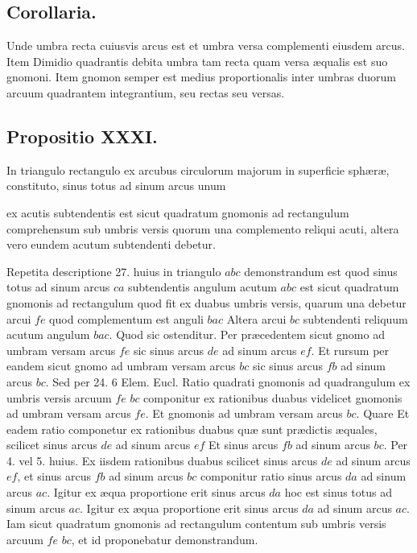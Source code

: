 \documentclass[11pt,a4paper]{article}
\begin{document}
\subsection*{Corollaria.}

Unde umbra recta cuiusvis arcus est et umbra versa complementi
eiusdem arcus. Item Dimidio quadrantis debita umbra tam recta
quam versa æqualis est suo gnomoni. Item gnomon semper est
medius proportionalis inter umbras duorum arcuum quadrantem
integrantium, seu rectas seu versas.

\subsection*{Propositio XXXI.}

In triangulo rectangulo ex arcubus circulorum majorum in
superficie sphæræ, constituto, sinus totus ad sinum arcus unum

ex acutis subtendentis est sicut quadratum gnomonis
ad rectangulum comprehensum sub umbris versis quorum
una complemento reliqui acuti, altera vero eundem
acutum subtendenti debetur.

Repetita descriptione 27. huius in triangulo $abc$ demonstrandum
est quod sinus totus ad sinum arcus $ca$ subtendentis angulum
acutum $abc$ est sicut quadratum gnomonis ad rectangulum
quod fit ex duabus umbris versis, quarum una debetur arcui
$fe$ quod complementum est anguli $bac$ Altera  arcui
$bc$ subtendenti reliquum acutum angulum $bac$. Quod sic
ostenditur. Per præcedentem sicut gnomo ad umbram versam
arcus $fe$ sic sinus arcus $de$ ad sinum arcus $ef$. Et rursum
per eandem sicut gnomo ad umbram versam arcus $bc$ sic
sinus arcus $fb$ ad sinum arcus $bc$. Sed per 24. 6 Elem. Eucl.
Ratio quadrati gnomonis ad quadrangulum ex umbris versis arcuum
$fe$ $bc$ componitur ex rationibus duabus videlicet gnomonis ad umbram
versam arcus $fe$. Et gnomonis ad umbram versam arcus $bc$. Quare
Et eadem ratio componetur ex rationibus duabus quæ sunt prædictis
æquales, scilicet sinus arcus $de$ ad sinum arcus $ef$ Et sinus arcus
$fb$ ad sinum arcus $bc$. Per 4. vel 5. huius. Ex iisdem rationibus
duabus scilicet sinus arcus $de$ ad sinum arcus $ef$, et sinus arcus
$fb$ ad sinum arcus $bc$ componitur ratio sinus arcus $da$ ad sinum
arcus $ac$. Igitur ex æqua proportione erit sinus arcus $da$ hoc
est sinus totus ad sinum arcus $ac$. Igitur ex æqua proportione
erit sinus arcus $da$ ad sinum arcus $ac$. Iam sicut quadratum
gnomonis ad rectangulum contentum sub umbris versis arcuum
$fe$ $bc$, et id proponebatur demonstrandum.
\end{document}
